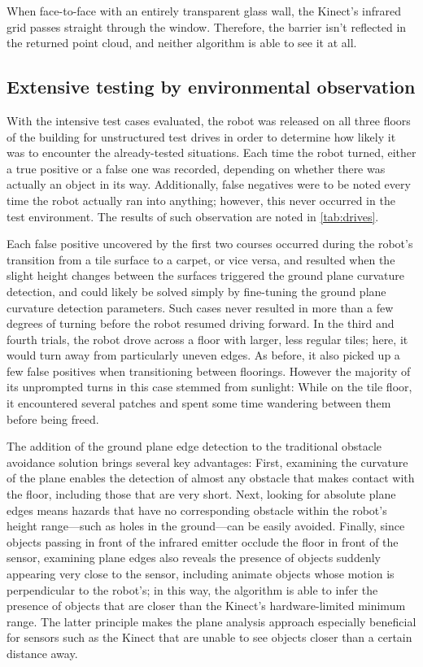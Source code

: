 \documentclass[12pt]{report}
\begin{document}
When face-to-face with an entirely transparent glass wall, the Kinect's infrared grid passes straight through the window.  Therefore, the barrier isn't reflected in the returned point cloud, and neither algorithm is able to see it at all.

\subsection[Extensive testing]{Extensive testing by environmental observation}
With the intensive test cases evaluated, the robot was released on all three floors of the building for unstructured test drives in order to determine how likely it was to encounter the already-tested situations.  Each time the robot turned, either a true positive or a false one was recorded, depending on whether there was actually an object in its way.  Additionally, false negatives were to be noted every time the robot actually ran into anything; however, this never occurred in the test environment.  The results of such observation are noted in \autoref{tab:drives}.

Each false positive uncovered by the first two courses occurred during the robot's transition from a tile surface to a carpet, or vice versa, and resulted when the slight height changes between the surfaces triggered the ground plane curvature detection, and could likely be solved simply by fine-tuning the ground plane curvature detection parameters.  Such cases never resulted in more than a few degrees of turning before the robot resumed driving forward.  In the third and fourth trials, the robot drove across a floor with larger, less regular tiles; here, it would turn away from particularly uneven edges.  As before, it also picked up a few false positives when transitioning between floorings.  However the majority of its unprompted turns in this case stemmed from sunlight:  While on the tile floor, it encountered several patches and spent some time wandering between them before being freed.

The addition of the ground plane edge detection to the traditional obstacle avoidance solution brings several key advantages:  First, examining the curvature of the plane enables the detection of almost any obstacle that makes contact with the floor, including those that are very short.  Next, looking for absolute plane edges means hazards that have no corresponding obstacle within the robot's height range---such as holes in the ground---can be easily avoided.  Finally, since objects passing in front of the infrared emitter occlude the floor in front of the sensor, examining plane edges also reveals the presence of objects suddenly appearing very close to the sensor, including animate objects whose motion is perpendicular to the robot's; in this way, the algorithm is able to infer the presence of objects that are closer than the Kinect's hardware-limited minimum range.  The latter principle makes the plane analysis approach especially beneficial for sensors such as the Kinect that are unable to see objects closer than a certain distance away.
\end{document}
